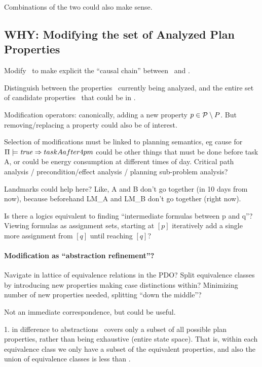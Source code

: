 Combinations of the two could also make sense.




\subsection{WHY: Modifying the set of Analyzed Plan Properties}
\label{xpp:identify-causes:analyzed}


Modify \props\ to make explicit the ``causal chain'' between
\prop\ and \propq. 

Distinguish between the properties \props\ currently being analyzed,
and the entire set of candidate properties \candprops\ that could be
in \props.

Modification operators: canonically, adding a new property $p \in
{\cal P} \setminus P$. But removing/replacing a property could
also be of interest.

Selection of modifications must be linked to planning semantics, eg
cause for $\Pi \models \mathit{true} \Rightarrow taskAafter4pm$ could be other
things that must be done before task A, or could be energy consumption
at different times of day. Critical path analysis /
precondition/effect analysis / planning sub-problem analysis?

Landmarks could help here? Like, A and B don't go together (in 10 days
from now), because beforehand LM\_A and LM\_B don't go together (right
now).

Is there a logics equivalent to finding ``intermediate formulas
between p and q''? Viewing formulas as assignment sets, starting at
$[p]$ iteratively add a single more assignment from $[q]$ until
reaching $[q]$?



\paragraph{Modification as ``abstraction refinement''?}

Navigate in lattice of equivalence relations in the PDO? Split
equivalence classes by introducing new properties making case
distinctions within? Minimizing number of new properties needed,
splitting ``down the middle''? 

Not an immediate correspondence, but could be useful.

1. in difference to abstractions \props\ covers only a subset of all
possible plan properties, rather than being exhaustive (entire state
space). That is, within each equivalence class we only have a subset
of the equivalent properties, and also the union of equivalence
classes is less than \candprops.

